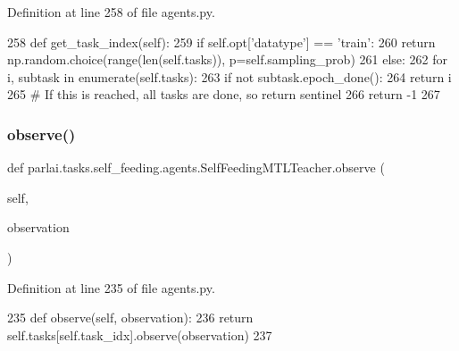 Definition at line 258 of file agents.\+py.


\begin{DoxyCode}
258     \textcolor{keyword}{def }get\_task\_index(self):
259         \textcolor{keywordflow}{if} self.opt[\textcolor{stringliteral}{'datatype'}] == \textcolor{stringliteral}{'train'}:
260             \textcolor{keywordflow}{return} np.random.choice(range(len(self.tasks)), p=self.sampling\_prob)
261         \textcolor{keywordflow}{else}:
262             \textcolor{keywordflow}{for} i, subtask \textcolor{keywordflow}{in} enumerate(self.tasks):
263                 \textcolor{keywordflow}{if} \textcolor{keywordflow}{not} subtask.epoch\_done():
264                     \textcolor{keywordflow}{return} i
265         \textcolor{comment}{# If this is reached, all tasks are done, so return sentinel}
266         \textcolor{keywordflow}{return} -1
267 
\end{DoxyCode}
\mbox{\label{classparlai_1_1tasks_1_1self__feeding_1_1agents_1_1SelfFeedingMTLTeacher_a6028394bf25ea9ae027bcf59a302a72c}} 
\subsubsection{\texorpdfstring{observe()}{observe()}}
{\footnotesize\ttfamily def parlai.\+tasks.\+self\+\_\+feeding.\+agents.\+Self\+Feeding\+M\+T\+L\+Teacher.\+observe (\begin{DoxyParamCaption}\item[{}]{self,  }\item[{}]{observation }\end{DoxyParamCaption})}



Definition at line 235 of file agents.\+py.


\begin{DoxyCode}
235     \textcolor{keyword}{def }observe(self, observation):
236         \textcolor{keywordflow}{return} self.tasks[self.task\_idx].observe(observation)
237 
\end{DoxyCode}
\mbox{\label{classparlai_1_1tasks_1_1self__feeding_1_1agents_1_1SelfFeedingMTLTeacher_a2edc59dcf9cae5a9d9c58f955c52d749}} 
